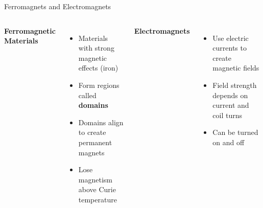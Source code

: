 \documentclass{beamer}
\begin{document}
\begin{frame}{Ferromagnets and Electromagnets}
\begin{columns}
\textbf{Ferromagnetic Materials}
\begin{itemize}
\item Materials with strong magnetic effects (iron)
\item Form regions called \textbf{domains}
\item Domains align to create permanent magnets
\item Lose magnetism above Curie temperature
\end{itemize}

\textbf{Electromagnets}
\begin{itemize}
\item Use electric currents to create magnetic fields
\item Field strength depends on current and coil turns
\item Can be turned on and off
\end{itemize}
\end{columns}
\end{frame}
\end{document}
